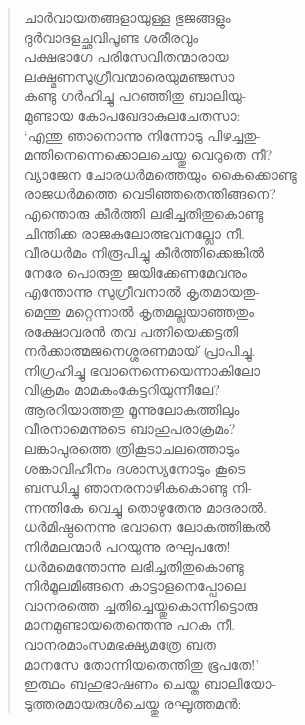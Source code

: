 \begin{verse}
ചാര്‍വായതങ്ങളായുള്ള ഭുജങ്ങളും\\
ദുര്‍വാദളച്ഛവിപൂണ്ട ശരീരവും\\
പക്ഷഭാഗേ പരിസേവിതന്മാരായ\\
ലക്ഷ്മണസുഗ്രീവന്മാരെയുമഞ്ജസാ\\
കണ്ടു ഗര്‍ഹിച്ചു പറഞ്ഞിതു ബാലിയു-\\
മുണ്ടായ കോപഖേദാകുലചേതസാ:\\
‘എന്തു ഞാനൊന്നു നിന്നോടു പിഴച്ചതു-\\
മന്തിനെന്നെക്കൊലചെയ്തു വെറുതെ നീ?\\
വ്യാജേന ചോരധര്‍മത്തെയും കൈക്കൊണ്ടു\\
രാജധര്‍മത്തെ വെടിഞ്ഞതെന്തിങ്ങനെ?\\
എന്തൊരു കീര്‍ത്തി ലഭിച്ചതിതുകൊണ്ടു\\
ചിന്തിക്ക രാജകുലോത്ഭവനല്ലോ നീ.\\
വീരധര്‍മം നിരൂപിച്ചു കീര്‍ത്തിക്കെങ്കില്‍\\
നേരേ പൊരുതു ജയിക്കേണമേവനും\\
എന്തോന്നു സുഗ്രീവനാല്‍ കൃതമായതു-\\
മെന്തു മറ്റെന്നാല്‍ കൃതമല്ലയാഞ്ഞതും\\
രക്ഷോവരന്‍ തവ പത്നിയെക്കട്ടതി\\
നര്‍ക്കാത്മജനെശ്ശരണമായ് പ്രാപിച്ചു.\\
നിഗ്രഹിച്ചു ഭവാനെന്നെയെന്നാകിലോ\\
വിക്രമം മാമകംകേട്ടറിയുന്നീലേ?\\
ആരറിയാത്തതു മൂന്നുലോകത്തിലും\\
വീരനാമെന്നുടെ ബാഹുപരാക്രമം?\\
ലങ്കാപുരത്തെ ത്രികൂടാചലത്തൊടും\\
ശങ്കാവിഹീനം ദശാസ്യനോടും കൂടെ\\
ബന്ധിച്ചു ഞാനരനാഴികകൊണ്ടു നി-\\
ന്നന്തികേ വെച്ചു തൊഴുതേനു മാദരാല്‍.\\
ധര്‍മിഷ്ഠനെന്നു ഭവാനെ ലോകത്തിങ്കല്‍\\
നിര്‍മലന്മാര്‍ പറയുന്നു രഘുപതേ!\\
ധര്‍മമെന്തോന്നു ലഭിച്ചതിതുകൊണ്ടു\\
നിര്‍മൂലമിങ്ങനെ കാട്ടാളനെപ്പോലെ\\
വാനരത്തെ ച്ചതിച്ചെയ്തുകൊന്നിട്ടൊരു\\
മാനമുണ്ടായതെന്തെന്നു പറക നീ.\\
വാനരമാംസമഭക്ഷ്യമത്രേ ബത\\
മാനസേ തോന്നിയതെന്തിതു ഭൂപതേ!’\\
ഇത്ഥം ബഹുഭാഷണം ചെയ്ത ബാലിയോ-\\
ടുത്തരമായരുള്‍ചെയ്തു രഘൂത്തമന്‍:\\

\end{verse}
